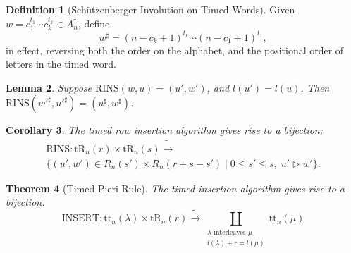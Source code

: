\documentclass[10pt]{amsproc}
\newtheorem{theorem}{Theorem}[subsection]
\newtheorem{lemma}[theorem]{Lemma}
\newtheorem{corollary}[theorem]{Corollary}
\theoremstyle{definition}
\newtheorem{definition}[theorem]{Definition}
\theoremstyle{remark}
\newcommand{\rowins}{\mathrm{RINS}}
\newcommand{\ins}{\mathrm{INSERT}}
\newcommand{\ttab}{\mathrm{tt}}
\newcommand{\tr}{\mathrm{tR}}
\begin{document}
\begin{definition}
  [Sch\"utzenberger Involution on Timed Words]
  \label{definition:schuetzenberger-involution}
  Given $w=c_1^{t_1}\dotsb c_k^{t_k}\in A_n^\dagger$, define
  \begin{equation}
    \label{eq:sharp}
    w^\sharp = (n-c_k+1)^{t_k} \dotsb (n-c_1+1)^{t_1},
  \end{equation}
  in effect, reversing both the order on the alphabet, and the positional order of letters in the timed word.
\end{definition}
\begin{lemma}
  \label{lemma:reverse-row-insertion}
  Suppose $\rowins(w,u)=(u',w')$, and $l(u')=l(u)$.
  Then $\rowins({w'}^\sharp,{u'}^\sharp)=(u^\sharp,w^\sharp)$.
\end{lemma}
\begin{corollary}
  \label{corollary:row-insertion-bijection}
  The timed row insertion algorithm gives rise to a bijection:
  \begin{multline*}
    \rowins: \tr_n(r)\times \tr_n(s) \tilde\to \\\{(u',w')\in R_n(s')\times R_n(r+s-s')\mid 0\leq s'\leq s,\; u'\rhd w'\}. 
  \end{multline*}
\end{corollary}
\begin{theorem}[Timed Pieri Rule]
  \label{theorem:pieri}
  The timed insertion algorithm gives rise to a bijection:
  \begin{displaymath}
    \ins: \ttab_n(\lambda)\times \tr_n(r) \tilde\to \coprod_{\begin{smallmatrix}\text{$\lambda$ interleaves $\mu$}\\{l(\lambda)+r = l(\mu)}\end{smallmatrix}} \ttab_n(\mu)
  \end{displaymath}
\end{theorem}
\end{document}
